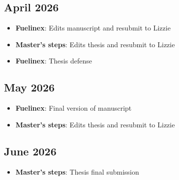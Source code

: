 \documentclass{article}
\begin{document}
\subsection*{April 2026}
\begin{itemize}
    \item \textbf{Fuelinex}: Edits manuscript and resubmit to Lizzie
    \item \textbf{Master's steps}: Edits thesis and resubmit to Lizzie
    \item \textbf{Fuelinex}: Thesis defense
\end{itemize}

\subsection*{May 2026}
\begin{itemize}
    \item \textbf{Fuelinex}: Final version of manuscript
    \item \textbf{Master's steps}: Edits thesis and resubmit to Lizzie
\end{itemize}

\subsection*{June 2026}
\begin{itemize}
    \item \textbf{Master's steps}: Thesis final submission
\end{itemize}


\end{document}
